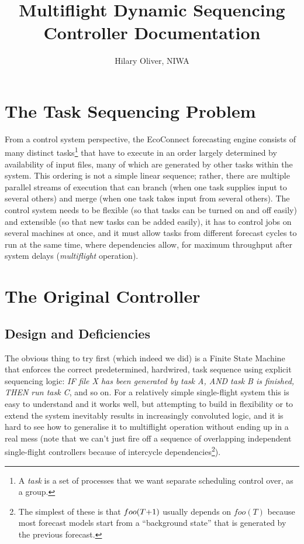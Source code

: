 \documentclass[11pt,a4paper]{report}
\title{Multiflight Dynamic Sequencing Controller Documentation}
\author{Hilary Oliver, NIWA}
\begin{document}
\maketitle
\tableofcontents

\chapter{The Task Sequencing Problem} 

From a control system perspective, the EcoConnect forecasting engine
consists of many distinct tasks\footnote{A {\em task} is a set of
processes that we want separate scheduling control over, as a group.}
that have to execute in an order largely determined by availability of
input files, many of which are generated by other tasks within the
system. This ordering is not a simple linear sequence; rather, there are
multiple parallel streams of execution that can branch (when one task
supplies input to several others) and merge (when one task takes input
from several others). The control system needs to be flexible (so that
tasks can be turned on and off easily) and extensible (so that new tasks
can be added easily), it has to control jobs on several machines at
once, and it must allow tasks from different forecast cycles to run at
the same time, where dependencies allow, for maximum throughput after
system delays ({\em multiflight} operation). 


\chapter{The Original Controller}

\section{Design and Deficiencies}

The obvious thing to try first (which indeed we did) is a Finite State
Machine that enforces the correct predetermined, hardwired, task
sequence using explicit sequencing logic: {\em IF file X has been
generated by task A, AND task B is finished, THEN run task C}, and so
on. For a relatively simple single-flight system this is easy to
understand and it works well, but attempting to build in flexibility or
to extend the system inevitably results in increasingly convoluted
logic, and it is hard to see how to generalise it to multiflight
operation without ending up in a real mess (note that we can't just fire
off a sequence of overlapping independent single-flight controllers
because of intercycle dependencies\footnote{The simplest of these is
that $foo(T\negmedspace +\negmedspace 1)$ usually depends on $foo(T)$
because most forecast models start from a ``background state'' that is
generated by the previous forecast.}). 
\end{document}
